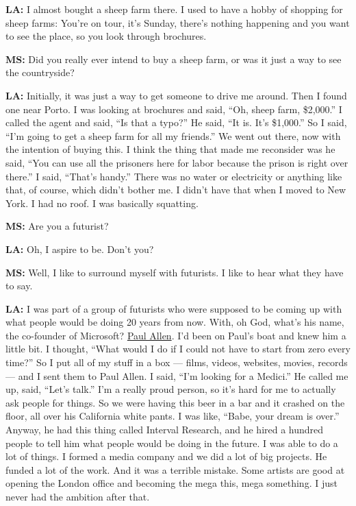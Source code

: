 \textbf{LA:} I almost bought a sheep farm there. I used to have a hobby
of shopping for sheep farms: You're on tour, it's Sunday, there's
nothing happening and you want to see the place, so you look through
brochures.

\textbf{MS:} Did you really ever intend to buy a sheep farm, or was it
just a way to see the countryside?

\textbf{LA:} Initially, it was just a way to get someone to drive me
around. Then I found one near Porto. I was looking at brochures and
said, ``Oh, sheep farm, \$2,000.'' I called the agent and said, ``Is
that a typo?'' He said, ``It is. It's \$1,000.'' So I said, ``I'm going
to get a sheep farm for all my friends.'' We went out there, now with
the intention of buying this. I think the thing that made me reconsider
was he said, ``You can use all the prisoners here for labor because the
prison is right over there.'' I said, ``That's handy.'' There was no
water or electricity or anything like that, of course, which didn't
bother me. I didn't have that when I moved to New York. I had no roof. I
was basically squatting.

\textbf{MS:} Are you a futurist?

\textbf{LA:} Oh, I aspire to be. Don't you?

\textbf{MS:} Well, I like to surround myself with futurists. I like to
hear what they have to say.

\textbf{LA:} I was part of a group of futurists who were supposed to be
coming up with what people would be doing 20 years from now. With, oh
God, what's his name, the co-founder of Microsoft?
\href{https://www.nytimes3xbfgragh.onion/2018/10/15/obituaries/paul-allen-dead.html}{Paul
Allen}. I'd been on Paul's boat and knew him a little bit. I thought,
``What would I do if I could not have to start from zero every time?''
So I put all of my stuff in a box --- films, videos, websites, movies,
records --- and I sent them to Paul Allen. I said, ``I'm looking for a
Medici.'' He called me up, said, ``Let's talk.'' I'm a really proud
person, so it's hard for me to actually ask people for things. So we
were having this beer in a bar and it crashed on the floor, all over his
California white pants. I was like, ``Babe, your dream is over.''
Anyway, he had this thing called Interval Research, and he hired a
hundred people to tell him what people would be doing in the future. I
was able to do a lot of things. I formed a media company and we did a
lot of big projects. He funded a lot of the work. And it was a terrible
mistake. Some artists are good at opening the London office and becoming
the mega this, mega something. I just never had the ambition after that.

